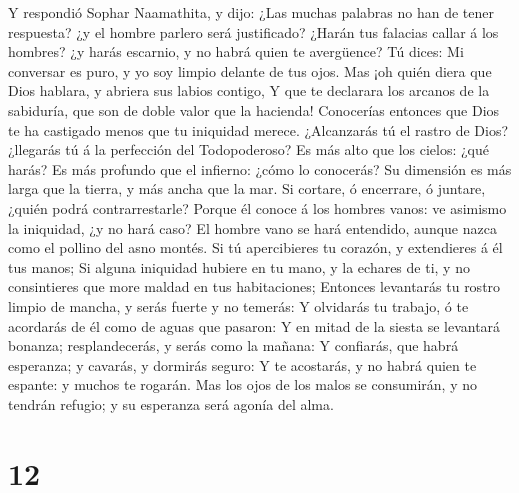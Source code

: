  Y respondió Sophar Naamathita, y dijo:  ¿Las
muchas palabras no han de tener respuesta? ¿y el hombre parlero será
justificado?  ¿Harán tus falacias callar á los hombres? ¿y
harás escarnio, y no habrá quien te avergüence?  Tú dices:
Mi conversar es puro, y yo soy limpio delante de tus ojos. 
Mas ¡oh quién diera que Dios hablara, y abriera sus labios contigo,
 Y que te declarara los arcanos de la sabiduría, que son de
doble valor que la hacienda! Conocerías entonces que Dios te ha
castigado menos que tu iniquidad merece.  ¿Alcanzarás tú el
rastro de Dios? ¿llegarás tú á la perfección del Todopoderoso?
 Es más alto que los cielos: ¿qué harás? Es más profundo que
el infierno: ¿cómo lo conocerás?  Su dimensión es más larga
que la tierra, y más ancha que la mar.  Si cortare, ó
encerrare, ó juntare, ¿quién podrá contrarrestarle?  Porque
él conoce á los hombres vanos: ve asimismo la iniquidad, ¿y no hará
caso?  El hombre vano se hará entendido, aunque nazca como
el pollino del asno montés.  Si tú apercibieres tu corazón,
y extendieres á él tus manos;  Si alguna iniquidad hubiere
en tu mano, y la echares de ti, y no consintieres que more maldad en tus
habitaciones;  Entonces levantarás tu rostro limpio de
mancha, y serás fuerte y no temerás:  Y olvidarás tu
trabajo, ó te acordarás de él como de aguas que pasaron:  Y
en mitad de la siesta se levantará bonanza; resplandecerás, y serás como
la mañana:  Y confiarás, que habrá esperanza; y cavarás, y
dormirás seguro:  Y te acostarás, y no habrá quien te
espante: y muchos te rogarán.  Mas los ojos de los malos se
consumirán, y no tendrán refugio; y su esperanza será agonía del alma.

\hypertarget{section-11}{%
\section{12}\label{section-11}}

